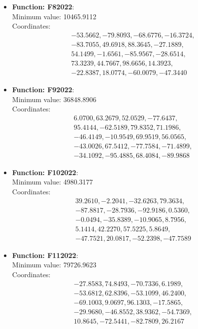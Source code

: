 \documentclass{article}
\begin{document}
\begin{itemize}
  \item \textbf{Function: F82022}: \\
    Minimum value: 10465.9112 \\
    Coordinates:
    \[
      \begin{aligned}
        & -53.5662, -79.8093, -68.6776, -16.3724, \\
        & -83.7055, 49.6918, 88.3645, -27.1889, \\
        & 54.1499, -1.6561, -85.9567, -28.6514, \\
        & 73.3239, 44.7667, 98.6656, 14.3923, \\
        & -22.8387, 18.0774, -60.0079, -47.3440
      \end{aligned}
    \]

  \item \textbf{Function: F92022}: \\
    Minimum value: 36848.8906 \\
    Coordinates:
    \[
      \begin{aligned}
        & 6.0700, 63.2679, 52.0529, -77.6437, \\
        & 95.4144, -62.5189, 79.8352, 71.1986, \\
        & -46.4149, -10.9549, 69.9519, 56.0565, \\
        & -43.0026, 67.5412, -77.7584, -71.4899, \\
        & -34.1092, -95.4885, 68.4084, -89.9868
      \end{aligned}
    \]

  \item \textbf{Function: F102022}: \\
    Minimum value: 4980.3177 \\
    Coordinates:
    \[
      \begin{aligned}
        & 39.2610, -2.2041, -32.6263, 79.3634, \\
        & -87.8817, -28.7936, -92.9186, 0.5360, \\
        & -0.0494, -35.8389, -10.9065, 8.7956, \\
        & 5.1414, 42.2270, 57.5225, 5.8649, \\
        & -47.7521, 20.0817, -52.2398, -47.7589
      \end{aligned}
    \]

  \item \textbf{Function: F112022}: \\
    Minimum value: 79726.9623 \\
    Coordinates:
    \[
      \begin{aligned}
        & -27.8583, 74.8493, -70.7336, 6.1989, \\
        & -53.6812, 62.8396, -53.1099, 46.2400, \\
        & -69.1003, 9.0697, 96.1303, -17.5865, \\
        & -29.9680, -46.8552, 38.9362, -54.7369, \\
        & 10.8645, -72.5441, -82.7809, 26.2167
      \end{aligned}
    \]


\end{itemize}
\end{document}

